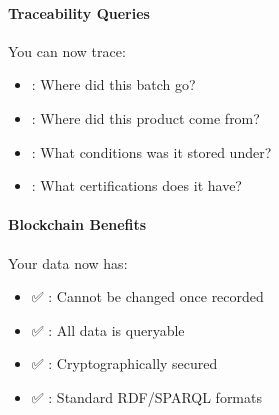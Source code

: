 \documentclass[letterpaper,10pt,english]{sphinxmanual}
\begin{document}
\begin{sphinxVerbatim}[commandchars=\\\{\}]
 
     
                
                

     
            
\end{sphinxVerbatim}


\paragraph{Traceability Queries}
\label{\detokenize{tutorials/first-supply-chain:traceability-queries}}
\sphinxAtStartPar
You can now trace:
\begin{itemize}
\item {} 
\sphinxAtStartPar
{}: Where did this batch go?

\item {} 
\sphinxAtStartPar
{}: Where did this product come from?

\item {} 
\sphinxAtStartPar
{}: What conditions was it stored under?

\item {} 
\sphinxAtStartPar
{}: What certifications does it have?

\end{itemize}


\paragraph{Blockchain Benefits}
\label{\detokenize{tutorials/first-supply-chain:blockchain-benefits}}
\sphinxAtStartPar
Your data now has:
\begin{itemize}
\item {} 
\sphinxAtStartPar
✅ : Cannot be changed once recorded

\item {} 
\sphinxAtStartPar
✅ : All data is queryable

\item {} 
\sphinxAtStartPar
✅ : Cryptographically secured

\item {} 
\sphinxAtStartPar
✅ : Standard RDF/SPARQL formats

\end{itemize}
\end{document}

